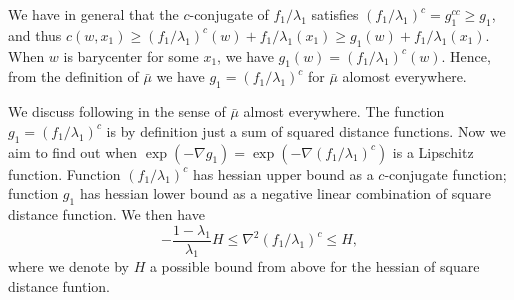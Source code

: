 We have in general that the $c$-conjugate of $f_1 / \lambda_1$ satisfies
$(f_1 / \lambda_1)^c = g_1^{cc} \geq g_1$,
and thus $c(w, x_1) \geq (f_1 / \lambda_1)^c(w) + f_1/\lambda_1 (x_1) \geq g_1(w) + f_1/\lambda_1 (x_1)$.
When $w$ is barycenter for some $x_1$,
we have $g_1(w) = (f_1 / \lambda_1)^c(w)$.
Hence, from the definition of $\bar{\mu}$ we have
$g_1 = (f_1 /\lambda_1)^c$ for $\bar{\mu}$ alomost everywhere.

We discuss following in the sense of $\bar{\mu}$ almost everywhere. The function $g_1 = (f_1 / \lambda_1)^c $ is by definition just a sum of squared distance functions.
Now we aim to find out when \( \exp(- \nabla g_1 ) = \exp(- \nabla (f_1 / \lambda_1)^c) \) is a Lipschitz function.
Function $(f_1 / \lambda_1)^c$ has hessian upper bound as a $c$-conjugate function;
function $g_1$ has hessian lower bound as a negative linear combination of square distance function.
We then have
\begin{equation}
	\label{equa:hessian_bound_f}
	-\frac{1-\lambda_1}{\lambda_1} H \leq \nabla^2 (f_1 / \lambda_1)^c \leq H,
\end{equation}
where we denote by $H$ a possible bound from above for the hessian of square distance funtion.

